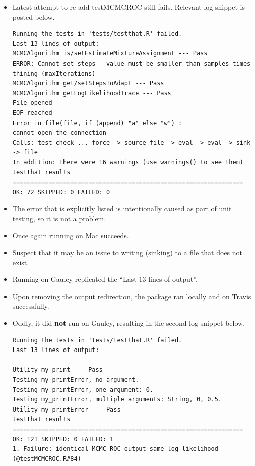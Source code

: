 \documentclass[12pt,hyperref]{labbook}
\begin{document}

\begin{itemize}
    \item Latest attempt to re-add testMCMCROC still fails. 
    Relevant log snippet is posted below.
    
\noindent\begin{minipage}{\linewidth}
\begin{lstlisting}
Running the tests in 'tests/testthat.R' failed.
Last 13 lines of output:
MCMCAlgorithm is/setEstimateMixtureAssignment --- Pass
ERROR: Cannot set steps - value must be smaller than samples times thining (maxIterations)
MCMCAlgorithm get/setStepsToAdapt --- Pass
MCMCAlgorithm getLogLikelihoodTrace --- Pass
File opened
EOF reached
Error in file(file, if (append) "a" else "w") : 
cannot open the connection
Calls: test_check ... force -> source_file -> eval -> eval -> sink -> file
In addition: There were 16 warnings (use warnings() to see them)
testthat results ================================================================
OK: 72 SKIPPED: 0 FAILED: 0
\end{lstlisting}
\end{minipage}

    \item The error that is explicitly listed is intentionally caused as part of unit testing, so it is not a problem.
    \item Once again running on Mac succeeds.
    \item Suspect that it may be an issue to writing (sinking) to a file that does not exist.
    \item Running on Gauley replicated the \enquote{Last 13 lines of output}.
    \item Upon removing the output redirection, the package ran locally and on Travis successfully.
    \item Oddly, it did \textbf{not} run on Gauley, resulting in the second log snippet below.
    
\noindent\begin{minipage}{\linewidth}
\begin{lstlisting}
Running the tests in 'tests/testthat.R' failed.
Last 13 lines of output:
  
Utility my_print --- Pass
Testing my_printError, no argument.
Testing my_printError, one argument: 0.
Testing my_printError, multiple arguments: String, 0, 0.5.
Utility my_printError --- Pass
testthat results ================================================================
OK: 121 SKIPPED: 0 FAILED: 1
1. Failure: identical MCMC-ROC output same log likelihood (@testMCMCROC.R#84) 


\end{lstlisting}
\end{minipage}
\end{itemize}
\end{document}

